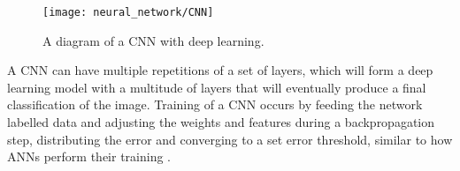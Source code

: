 \begin{itemize}
	\begin{figure}[h]
		\texttt{[image: neural\_network/CNN]}%
		\caption{A diagram of a CNN with deep learning.}%
		\label{fig:cnnfig}%
	\end{figure}
\end{itemize}

A CNN can have multiple repetitions of a set of layers, which will form a deep learning model with a multitude of layers that will eventually produce a final classification of the image. Training of a CNN occurs by feeding the network labelled data and adjusting the weights and features during a backpropagation step, distributing the error and converging to a set error threshold, similar to how ANNs perform their training \citep{Iizuka:2016:LCJ:2897824.2925974}.

